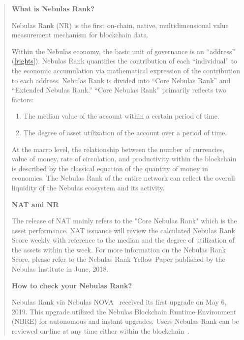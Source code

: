 \begin{quote}
	\textbf{What is Nebulas Rank?}
		
	Nebulas Rank (NR) is the first on-chain, native, multidimensional value measurement mechanism for blockchain data.

	Within the Nebulas economy, the basic unit of governance is an “address” (\ref{rights}). Nebulas Rank quantifies the contribution of each “individual” to the economic accumulation via mathematical expression of the contribution to each address. Nebulas Rank is divided into “Core Nebulas Rank” and “Extended Nebulas Rank.” “Core Nebulas Rank” primarily reflects two factors:

	\begin{enumerate}
		\item The median value of the account within a certain period of time.
		\item The degree of asset utilization of the account over a period of time.
	\end{enumerate}

	At the macro level, the relationship between the number of currencies, value of money, rate of circulation, and productivity within the blockchain is described by the classical equation of the quantity of money in economics. The Nebulas Rank of the entire network can reflect the overall liquidity of the Nebulas ecosystem and its activity.

	\vspace{2em}

	\textbf{NAT and NR}

	The release of NAT mainly refers to the "Core Nebulas Rank" which is the asset performance. NAT issuance will review the calculated Nebulas Rank Score weekly with reference to the median and the degree of utilization of the assets within the week. For more information on the Nebulas Rank Score, please refer to the Nebulas Rank Yellow Paper published by the Nebulas Institute in June, 2018.

	\vspace{2em}

	\textbf{How to check your Nebulas Rank?}

Nebulas Rank via Nebulas NOVA~\cite{nova} received its first upgrade on May 6, 2019. This upgrade utilized the Nebulas Blockchain Runtime Environment (NBRE) for autonomous and instant upgrades. Users Nebulas Rank can be reviewed on-line at any time either within the blockchain~\cite{explorer}.
\end{quote}


